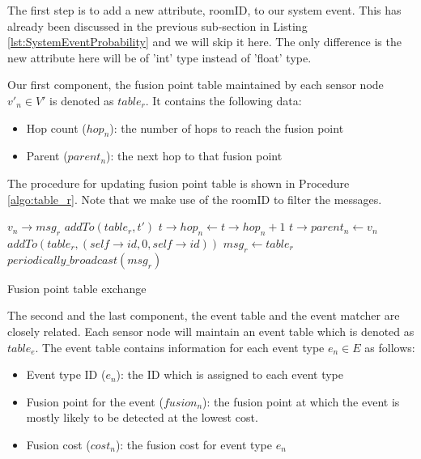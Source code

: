 The first step is to add a new attribute, roomID, to our system event. This has already been discussed in the previous sub-section in Listing \ref{lst:SystemEventProbability} and we will skip it here. The only difference is the new attribute here will be of 'int' type instead of 'float' type.

Our first component, the fusion point table maintained by each sensor node \(v'_n\in V'\) is denoted as \(table_r\). It contains the following data:
\begin{itemize}
\item	Hop count (\(hop_n\)): the number of hops to reach the fusion point
\item	Parent (\(parent_n\)): the next hop to that fusion point
\end{itemize}

The procedure for updating fusion point table is shown in Procedure \ref{algo:table_r}. Note that we make use of the roomID to filter the messages.
\begin{algorithm}
\begin{algorithmic}
\REQUIRE \(v_n\rightarrow msg_r\)
			\STATE \(addTo(table_r, t')\)
		\ENDIF
					\STATE \(t\rightarrow hop_n \gets t\rightarrow hop_n+1\)
					\STATE \(t\rightarrow parent_n \gets v_n\)
				\ENDIF
			\ENDIF
		\ENDFOR
	\ENDFOR
		\STATE \(addTo(table_r, (self\rightarrow id, 0, self\rightarrow id))\)
	\ENDIF
	\STATE \(msg_r \gets table_r\)
	\STATE \(periodically\_broadcast(msg_r)\)
\end{algorithmic}
\caption{Fusion point table exchange}
\label{algo:table_r}
\end{algorithm}

The second and the last component, the event table and the event matcher are closely related. Each sensor node will maintain an event table which is denoted as \(table_e\). The event table contains information for each event type \(e_n\in E\) as follows:
\begin{itemize}
\item Event type ID (\(e_n\)): the ID which is assigned to each event type
\item Fusion point for the event (\(fusion_n\)): the fusion point at which the event is mostly likely to be detected at the lowest cost.
\item Fusion cost (\(cost_n\)): the fusion cost for event type \(e_n\)
\end{itemize}

